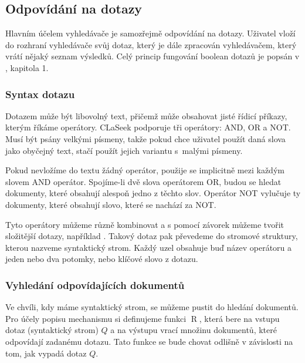 \documentclass{article}
\newcommand{\name}{CLaSeek}
\newcommand{\sep}{\,|\,}
\newcommand{\ssection}[1]{\subsection{#1}}
\newcommand{\sssection}[1]{\subsubsection{#1}}
\newcommand{\adds}[1]{\left\{#1\right\}}
\newcommand{\eq}{\Leftrightarrow}
\DeclareMathOperator{\stem}{stem}
\DeclareMathOperator{\wcount}{sf}
\DeclareMathOperator{\getdocs}{R}
\newcommand{\invstem}{\stem^{-1}}
\begin{document}



\ssection{Odpovídání na dotazy}
Hlavním účelem vyhledávače je samozřejmě odpovídání na dotazy. Uživatel vloží do rozhraní vyhledávače svůj dotaz, který je dále zpracován vyhledávačem, který vrátí nějaký seznam výsledků. Celý princip fungování boolean dotazů je popsán v \cite{introir}, kapitola 1. 

\sssection{Syntax dotazu}
Dotazem může být libovolný text, přičemž může obsahovat jisté řídicí příkazy, kterým říkáme operátory. \name{} podporuje tři operátory: AND, OR a NOT. Musí být psány velkými písmeny, takže pokud chce uživatel použít daná slova jako obyčejný text, stačí použít jejich variantu s~malými písmeny. 

Pokud nevložíme do textu žádný operátor, použije se implicitně mezi každým slovem AND operátor. Spojíme-li dvě slova operátorem OR, budou se hledat dokumenty, které obsahují alespoň jedno z těchto slov. Operátor NOT vylučuje ty dokumenty, které obsahují slovo, které se nachází za NOT. 

Tyto operátory můžeme různě kombinovat a s pomocí závorek můžeme tvořit složitější dotazy, například . Takový dotaz pak převedeme do stromové struktury, kterou nazveme syntaktický strom. Každý uzel obsahuje buď název operátoru a jeden nebo dva potomky, nebo klíčové slovo z dotazu. 


\sssection{Vyhledání odpovídajících dokumentů}

Ve chvíli, kdy máme syntaktický strom, se můžeme pustit do hledání dokumentů. Pro účely popisu mechanismu si definujeme funkci $\getdocs$, která bere na vstupu dotaz (syntaktický strom) $Q$ a na výstupu vrací množinu dokumentů, které odpovídají zadanému dotazu. Tato funkce se bude chovat odlišně v závislosti na tom, jak vypadá dotaz $Q$. 
\end{document}
